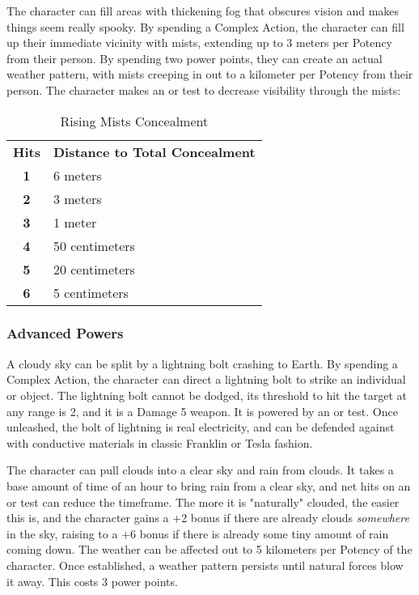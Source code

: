  The character can fill areas with thickening fog that obscures vision and makes things seem really spooky. By spending a Complex Action, the character can fill up their immediate vicinity with mists, extending up to 3 meters per Potency from their person. By spending two power points, they can create an actual weather pattern, with mists creeping in out to a kilometer per Potency from their person. The character makes an  or  test to decrease visibility through the mists:

\begin{table}[htb]
 \caption{Rising Mists Concealment} \centering
\begin{tabular}{c l}
\textbf{Hits}&\textbf{Distance to Total Concealment}\\
\textbf{1}& 6 meters\\
\textbf{2}& 3 meters\\
\textbf{3}& 1 meter\\
\textbf{4}& 50 centimeters\\
\textbf{5}& 20 centimeters\\
\textbf{6}& 5 centimeters\\
\end{tabular}
\end{table}

\subsubsection{Advanced Powers}

 A cloudy sky can be split by a lightning bolt crashing to Earth. By spending a Complex Action, the character can direct a lightning bolt to strike an individual or object. The lightning bolt cannot be dodged, its threshold to hit the target at any range is 2, and it is a Damage 5 weapon. It is powered by an  or  test. Once unleashed, the bolt of lightning is real electricity, and can be defended against with conductive materials in classic Franklin or Tesla fashion.

 The character can pull clouds into a clear sky and rain from clouds. It takes a base amount of time of an hour to bring rain from a clear sky, and net hits on an  or  test can reduce the timeframe. The more it is "naturally" clouded, the easier this is, and the character gains a +2 bonus if there are already clouds \textit{somewhere} in the sky, raising to a +6 bonus if there is already some tiny amount of rain coming down. The weather can be affected out to 5 kilometers per Potency of the character. Once established, a weather pattern persists until natural forces blow it away. This costs 3 power points.

